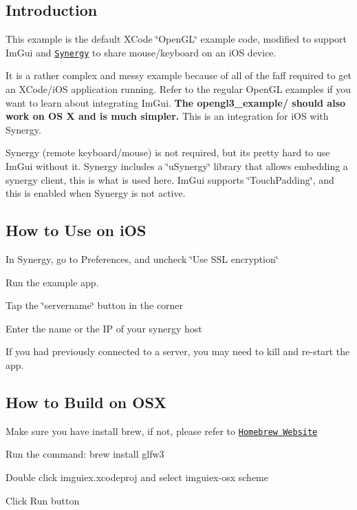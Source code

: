 \subsection*{Introduction}

This example is the default X\+Code \char`\"{}\+Open\+G\+L\char`\"{} example code, modified to support Im\+Gui and \href{http://synergy-project.org/}{\tt Synergy} to share mouse/keyboard on an i\+OS device.

It is a rather complex and messy example because of all of the faff required to get an X\+Code/i\+OS application running. Refer to the regular Open\+GL examples if you want to learn about integrating Im\+Gui. {\bfseries The opengl3\+\_\+example/ should also work on OS X and is much simpler.} This is an integration for i\+OS with Synergy.

Synergy (remote keyboard/mouse) is not required, but it\textquotesingle{}s pretty hard to use Im\+Gui without it. Synergy includes a \char`\"{}u\+Synergy\char`\"{} library that allows embedding a synergy client, this is what is used here. Im\+Gui supports \char`\"{}\+Touch\+Padding\char`\"{}, and this is enabled when Synergy is not active.

\subsection*{How to Use on i\+OS}


\begin{DoxyItemize}
\item In Synergy, go to Preferences, and uncheck \char`\"{}\+Use S\+S\+L encryption\char`\"{}
\item Run the example app.
\item Tap the \char`\"{}servername\char`\"{} button in the corner
\item Enter the name or the IP of your synergy host
\item If you had previously connected to a server, you may need to kill and re-\/start the app.
\end{DoxyItemize}

\subsection*{How to Build on O\+SX}


\begin{DoxyItemize}
\item Make sure you have install {\ttfamily brew}, if not, please refer to \href{http://brew.sh}{\tt Homebrew Website}
\item Run the command\+: {\ttfamily brew install glfw3}
\item Double click {\ttfamily imguiex.\+xcodeproj} and select {\ttfamily imguiex-\/osx} scheme
\item Click {\ttfamily Run} button
\end{DoxyItemize}

